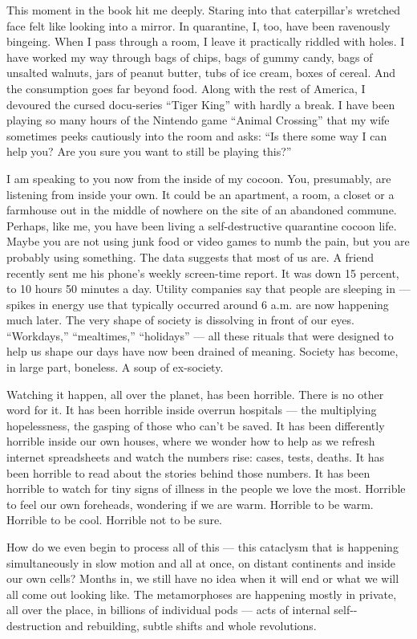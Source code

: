This moment in the book hit me deeply. Staring into that caterpillar's
wretched face felt like looking into a mirror. In quarantine, I, too,
have been ravenously bingeing. When I pass through a room, I leave it
practically riddled with holes. I have worked my way through bags of
chips, bags of gummy candy, bags of unsalted walnuts, jars of peanut
butter, tubs of ice cream, boxes of cereal. And the consumption goes far
beyond food. Along with the rest of America, I devoured the cursed
docu-series ``Tiger King'' with hardly a break. I have been playing so
many hours of the Nintendo game ``Animal Crossing'' that my wife
sometimes peeks cautiously into the room and asks: ``Is there some way I
can help you? Are you sure you want to still be playing this?''

I am speaking to you now from the inside of my cocoon. You, presumably,
are listening from inside your own. It could be an apartment, a room, a
closet or a farmhouse out in the middle of nowhere on the site of an
abandoned commune. Perhaps, like me, you have been living a
self-destructive quarantine cocoon life. Maybe you are not using junk
food or video games to numb the pain, but you are probably using
something. The data suggests that most of us are. A friend recently sent
me his phone's weekly screen-time report. It was down 15 percent, to 10
hours 50 minutes a day. Utility companies say that people are sleeping
in --- spikes in energy use that typically occurred around 6 a.m. are
now happening much later. The very shape of society is dissolving in
front of our eyes. ``Workdays,'' ``mealtimes,'' ``holidays'' --- all
these rituals that were designed to help us shape our days have now been
drained of meaning. Society has become, in large part, boneless. A soup
of ex-society.

Watching it happen, all over the planet, has been horrible. There is no
other word for it. It has been horrible inside overrun hospitals --- the
multiplying hopelessness, the gasping of those who can't be saved. It
has been differently horrible inside our own houses, where we wonder how
to help as we refresh internet spreadsheets and watch the numbers rise:
cases, tests, deaths. It has been horrible to read about the stories
behind those numbers. It has been horrible to watch for tiny signs of
illness in the people we love the most. Horrible to feel our own
foreheads, wondering if we are warm. Horrible to be warm. Horrible to be
cool. Horrible not to be sure.

How do we even begin to process all of this --- this cataclysm that is
happening simultaneously in slow motion and all at once, on distant
continents and inside our own cells? Months in, we still have no idea
when it will end or what we will all come out looking like. The
metamorphoses are happening mostly in private, all over the place, in
billions of individual pods --- acts of internal self-\/-destruction and
rebuilding, subtle shifts and whole revolutions.


